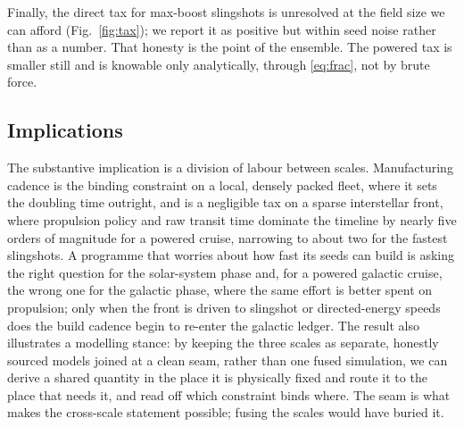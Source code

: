 Finally, the direct tax for max-boost slingshots is unresolved at the field size we can
afford (Fig.~\ref{fig:tax}); we report it as positive but within seed noise rather than as a
number. That honesty is the point of the ensemble. The powered tax is smaller still and is
knowable only analytically, through \eqref{eq:frac}, not by brute force.

\subsection{Implications}
The substantive implication is a division of labour between scales. Manufacturing cadence is
the binding constraint on a local, densely packed fleet, where it sets the doubling time
outright, and is a negligible tax on a sparse interstellar front, where propulsion policy and
raw transit time dominate the timeline by nearly five orders of magnitude for a powered cruise,
narrowing to about two for the fastest slingshots. A programme that worries about how fast its
seeds can build is asking the right question for the solar-system phase and, for a powered
galactic cruise, the wrong one for the galactic phase, where the same effort is better spent on
propulsion; only when the front is driven to slingshot or directed-energy speeds does the build
cadence begin to re-enter the galactic ledger. The
result also illustrates a modelling stance: by keeping the three scales as separate, honestly
sourced models joined at a clean seam, rather than one fused simulation, we can derive a shared
quantity in the place it is physically fixed and route it to the place that needs it, and read
off which constraint binds where. The seam is what makes the cross-scale statement possible;
fusing the scales would have buried it.
